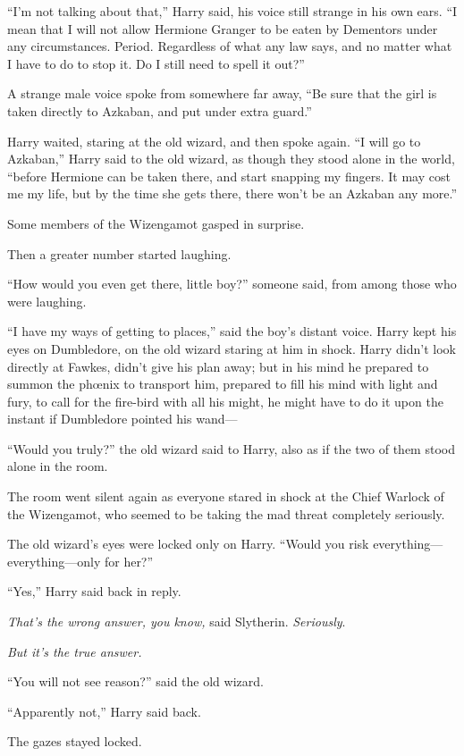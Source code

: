 “I’m not talking about that,” Harry said, his voice still strange in his own ears. “I mean that I will not allow Hermione Granger to be eaten by Dementors under any circumstances. Period. Regardless of what any law says, and no matter what I have to do to stop it. Do I still need to spell it out?”

A strange male voice spoke from somewhere far away, “Be sure that the girl is taken directly to Azkaban, and put under extra guard.”

Harry waited, staring at the old wizard, and then spoke again. “I will go to Azkaban,” Harry said to the old wizard, as though they stood alone in the world, “before Hermione can be taken there, and start snapping my fingers. It may cost me my life, but by the time she gets there, there won’t be an Azkaban any more.”

Some members of the Wizengamot gasped in surprise.

Then a greater number started laughing.

“How would you even get there, little boy?” someone said, from among those who were laughing.

“I have my ways of getting to places,” said the boy’s distant voice. Harry kept his eyes on Dumbledore, on the old wizard staring at him in shock. Harry didn’t look directly at Fawkes, didn’t give his plan away; but in his mind he prepared to summon the phœnix to transport him, prepared to fill his mind with light and fury, to call for the fire-bird with all his might, he might have to do it upon the instant if Dumbledore pointed his wand—

“Would you truly?” the old wizard said to Harry, also as if the two of them stood alone in the room.

The room went silent again as everyone stared in shock at the Chief Warlock of the Wizengamot, who seemed to be taking the mad threat completely seriously.

The old wizard’s eyes were locked only on Harry. “Would you risk everything—everything—only for her?”

“Yes,” Harry said back in reply.

\emph{That’s the wrong answer, you know,} said Slytherin. \emph{Seriously}.

\emph{But it’s the true answer.}

“You will not see reason?” said the old wizard.

“Apparently not,” Harry said back.

The gazes stayed locked.

